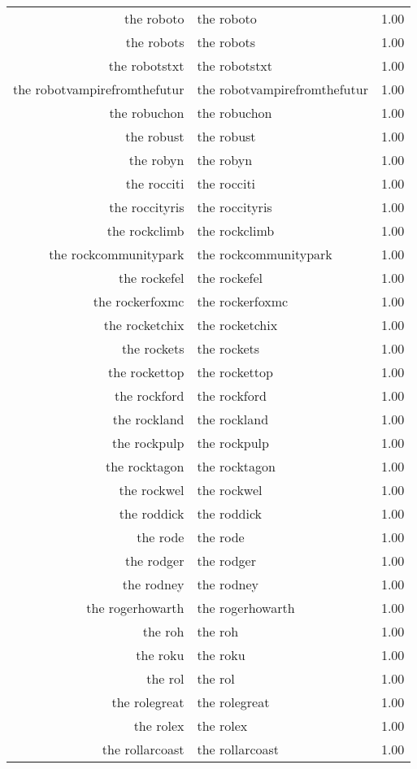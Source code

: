 \begin{table}[ht]
\begin{tabular}{rlr}
  the roboto & the roboto & 1.00 \\ 
  the robots & the robots & 1.00 \\ 
  the robotstxt & the robotstxt & 1.00 \\ 
  the robotvampirefromthefutur & the robotvampirefromthefutur & 1.00 \\ 
  the robuchon & the robuchon & 1.00 \\ 
  the robust & the robust & 1.00 \\ 
  the robyn & the robyn & 1.00 \\ 
  the rocciti & the rocciti & 1.00 \\ 
  the roccityris & the roccityris & 1.00 \\ 
  the rockclimb & the rockclimb & 1.00 \\ 
  the rockcommunitypark & the rockcommunitypark & 1.00 \\ 
  the rockefel & the rockefel & 1.00 \\ 
  the rockerfoxmc & the rockerfoxmc & 1.00 \\ 
  the rocketchix & the rocketchix & 1.00 \\ 
  the rockets & the rockets & 1.00 \\ 
  the rockettop & the rockettop & 1.00 \\ 
  the rockford & the rockford & 1.00 \\ 
  the rockland & the rockland & 1.00 \\ 
  the rockpulp & the rockpulp & 1.00 \\ 
  the rocktagon & the rocktagon & 1.00 \\ 
  the rockwel & the rockwel & 1.00 \\ 
  the roddick & the roddick & 1.00 \\ 
  the rode & the rode & 1.00 \\ 
  the rodger & the rodger & 1.00 \\ 
  the rodney & the rodney & 1.00 \\ 
  the rogerhowarth & the rogerhowarth & 1.00 \\ 
  the roh & the roh & 1.00 \\ 
  the roku & the roku & 1.00 \\ 
  the rol & the rol & 1.00 \\ 
  the rolegreat & the rolegreat & 1.00 \\ 
  the rolex & the rolex & 1.00 \\ 
  the rollarcoast & the rollarcoast & 1.00 \\ 

\end{tabular}
\end{table}
